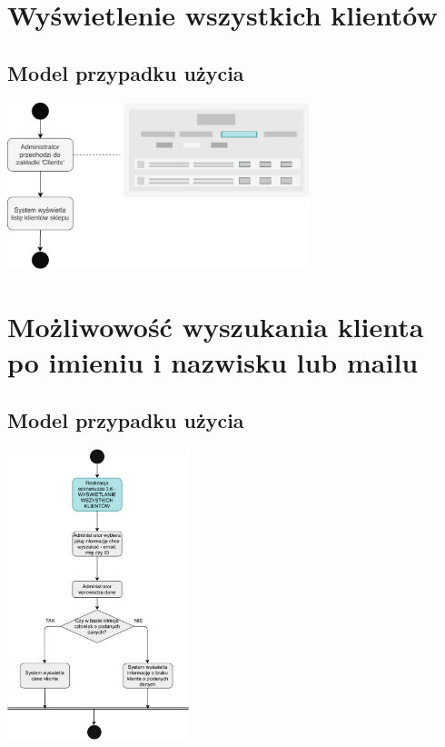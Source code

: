 \documentclass[12pt]{report}
\begin{document}
		
	\section{Wyświetlenie wszystkich klientów}
		\subsection{Model przypadku użycia}
			\begin{center}
				\includegraphics[width=250pt]{klienci.pdf}
			\end{center}
			
		
	\section{Możliwowość wyszukania klienta po imieniu i nazwisku lub mailu}
		\subsection{Model przypadku użycia}
			\begin{center}
				\includegraphics[width=150pt]{szukaj_klienta.pdf}
			\end{center}
		
\end{document}

